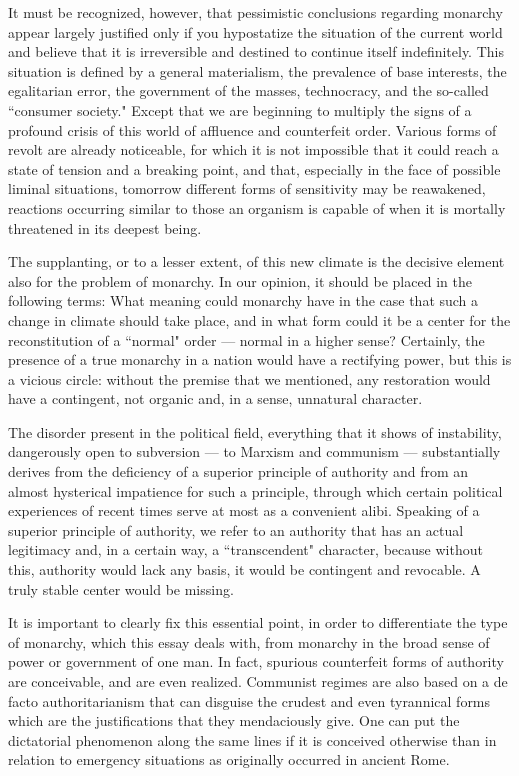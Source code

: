 It must be recognized, however, that pessimistic conclusions regarding monarchy appear largely justified only if you hypostatize the situation of the current world and believe that it is irreversible and destined to continue itself indefinitely. This situation is defined by a general materialism, the prevalence of base interests, the egalitarian error, the government of the masses, technocracy, and the so-called ``consumer society." Except that we are beginning to multiply the signs of a profound crisis of this world of affluence and counterfeit order. Various forms of revolt are already noticeable, for which it is not impossible that it could reach a state of tension and a breaking point, and that, especially in the face of possible liminal situations, tomorrow different forms of sensitivity may be reawakened, reactions occurring similar to those an organism is capable of when it is mortally threatened in its deepest being.

The supplanting, or to a lesser extent, of this new climate is the decisive element also for the problem of monarchy. In our opinion, it should be placed in the following terms: What meaning could monarchy have in the case that such a change in climate should take place, and in what form could it be a center for the reconstitution of a ``normal" order — normal in a higher sense? Certainly, the presence of a true monarchy in a nation would have a rectifying power, but this is a vicious circle: without the premise that we mentioned, any restoration would have a contingent, not organic and, in a sense, unnatural character.

The disorder present in the political field, everything that it shows of instability, dangerously open to subversion — to Marxism and communism — substantially derives from the deficiency of a superior principle of authority and from an almost hysterical impatience for such a principle, through which certain political experiences of recent times serve at most as a convenient alibi. Speaking of a superior principle of authority, we refer to an authority that has an actual legitimacy and, in a certain way, a ``transcendent" character, because without this, authority would lack any basis, it would be contingent and revocable. A truly stable center would be missing.

It is important to clearly fix this essential point, in order to differentiate the type of monarchy, which this essay deals with, from monarchy in the broad sense of power or government of one man. In fact, spurious counterfeit forms of authority are conceivable, and are even realized. Communist regimes are also based on a de facto authoritarianism that can disguise the crudest and even tyrannical forms which are the justifications that they mendaciously give. One can put the dictatorial phenomenon along the same lines if it is conceived otherwise than in relation to emergency situations as originally occurred in ancient Rome.

